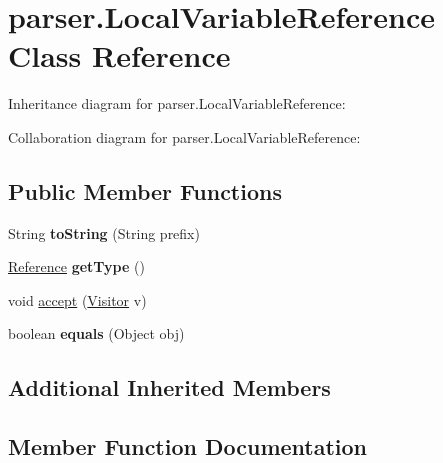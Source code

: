 \hypertarget{classparser_1_1_local_variable_reference}{}\section{parser.\+Local\+Variable\+Reference Class Reference}
\label{classparser_1_1_local_variable_reference}


Inheritance diagram for parser.\+Local\+Variable\+Reference\+:


Collaboration diagram for parser.\+Local\+Variable\+Reference\+:
\subsection*{Public Member Functions}
\begin{DoxyCompactItemize}
\item 
String {\bfseries to\+String} (String prefix)\hypertarget{classparser_1_1_local_variable_reference_a43c28a1830e6483ced541110dfc3cbbf}{}\label{classparser_1_1_local_variable_reference_a43c28a1830e6483ced541110dfc3cbbf}

\item 
\hyperlink{classparser_1_1_reference}{Reference} {\bfseries get\+Type} ()\hypertarget{classparser_1_1_local_variable_reference_a1e5e4c6d6120438a9640d6f17016313e}{}\label{classparser_1_1_local_variable_reference_a1e5e4c6d6120438a9640d6f17016313e}

\item 
void \hyperlink{classparser_1_1_local_variable_reference_a799efde6cbe6ad998fb83ac6e145f4cb}{accept} (\hyperlink{interfacemain_1_1_visitor}{Visitor} v)
\item 
boolean {\bfseries equals} (Object obj)\hypertarget{classparser_1_1_local_variable_reference_a8b127a275ceaaca55615eb6d0bcad085}{}\label{classparser_1_1_local_variable_reference_a8b127a275ceaaca55615eb6d0bcad085}

\end{DoxyCompactItemize}
\subsection*{Additional Inherited Members}


\subsection{Member Function Documentation}
